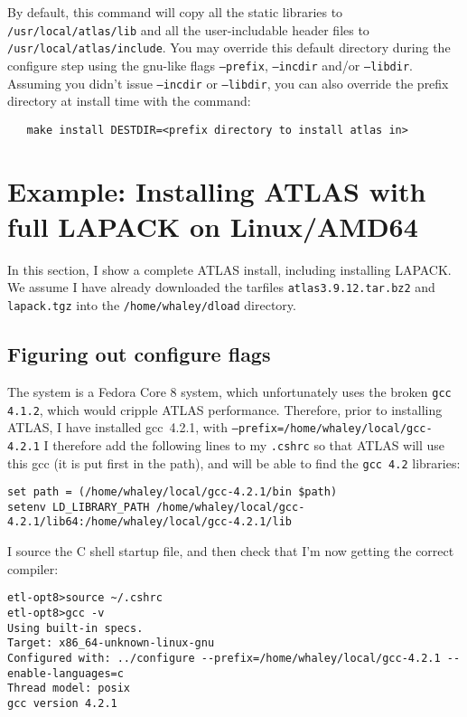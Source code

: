 \documentclass[11pt]{article}
\begin{document}
By default, this command will copy all the static libraries to
{\tt /usr/local/atlas/lib} and all the user-includable header files to
{\tt /usr/local/atlas/include}.  You may override this default directory
during the configure step using the gnu-like flags {\tt --prefix},
{\tt --incdir} and/or {\tt --libdir}.  Assuming you didn't issue
{\tt --incdir} or {\tt --libdir}, you can also override the prefix
directory at install time with the command:
\vspace*{-0.1in}
\begin{verbatim}
   make install DESTDIR=<prefix directory to install atlas in>
\end{verbatim}

\section{Example: Installing ATLAS with full LAPACK on Linux/AMD64}
\label{sec-example}
In this section, I show a complete ATLAS install, including installing
LAPACK.  We assume I have already downloaded the tarfiles 
{\tt atlas3.9.12.tar.bz2} and {\tt lapack.tgz} into the
{\tt /home/whaley/dload} directory.  

\subsection{Figuring out configure flags}
\label{sec-ex-configure}
The system is a Fedora Core 8 system, which unfortunately uses the broken
{\tt gcc 4.1.2}, which would cripple ATLAS performance.  Therefore, prior to
installing ATLAS, I have installed gcc~4.2.1, with 
   {\tt --prefix=/home/whaley/local/gcc-4.2.1}
I therefore add the following lines to my {\tt .cshrc} so that ATLAS
will use this gcc (it is put first in the path), and will be able
to find the {\tt gcc 4.2} libraries:
\begin{footnotesize}
\vspace*{-0.1in}
\begin{verbatim}
set path = (/home/whaley/local/gcc-4.2.1/bin $path)
setenv LD_LIBRARY_PATH /home/whaley/local/gcc-4.2.1/lib64:/home/whaley/local/gcc-4.2.1/lib
\end{verbatim}
\end{footnotesize}

\noindent
I source the C shell startup file, and then check that I'm now getting the
correct compiler:
\vspace*{-0.1in}
\begin{verbatim}
etl-opt8>source ~/.cshrc
etl-opt8>gcc -v
Using built-in specs.
Target: x86_64-unknown-linux-gnu
Configured with: ../configure --prefix=/home/whaley/local/gcc-4.2.1 --enable-languages=c
Thread model: posix
gcc version 4.2.1
\end{verbatim}
\end{document}
